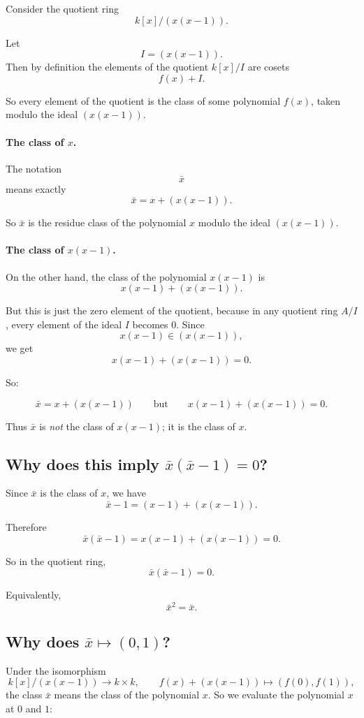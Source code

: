 \documentclass[12pt,a4paper]{article}
\theoremstyle{notespace}
\begin{document}
Consider the quotient ring
\[
k[x]/(x(x-1)).
\]

Let
\[
I=(x(x-1)).
\]
Then by definition the elements of the quotient \(k[x]/I\) are cosets
\[
f(x)+I.
\]

So every element of the quotient is the class of some polynomial \(f(x)\), taken modulo the ideal \((x(x-1))\).

\paragraph{The class of \(x\).}
The notation
\[
\bar x
\]
means exactly
\[
\bar x = x+(x(x-1)).
\]

So \(\bar x\) is the residue class of the polynomial \(x\) modulo the ideal \((x(x-1))\).

\paragraph{The class of \(x(x-1)\).}
On the other hand, the class of the polynomial \(x(x-1)\) is
\[
x(x-1)+(x(x-1)).
\]

But this is just the zero element of the quotient, because in any quotient ring \(A/I\), every element of the ideal \(I\) becomes \(0\). Since
\[
x(x-1)\in (x(x-1)),
\]
we get
\[
x(x-1)+(x(x-1))=0.
\]

So:

\[
\bar x = x+(x(x-1))
\qquad\text{but}\qquad
x(x-1)+(x(x-1))=0.
\]

Thus \(\bar x\) is \emph{not} the class of \(x(x-1)\); it is the class of \(x\).

\subsection*{Why does this imply \(\bar x(\bar x-1)=0\)?}

Since \(\bar x\) is the class of \(x\), we have
\[
\bar x-1=(x-1)+(x(x-1)).
\]

Therefore
\[
\bar x(\bar x-1)
=
x(x-1)+(x(x-1))
=
0.
\]

So in the quotient ring,
\[
\bar x(\bar x-1)=0.
\]

Equivalently,
\[
\bar x^2=\bar x.
\]

\subsection*{Why does \(\bar x\mapsto (0,1)\)?}

Under the isomorphism
\[
k[x]/(x(x-1))\longrightarrow k\times k,
\qquad
f(x)+(x(x-1))\longmapsto (f(0),f(1)),
\]
the class \(\bar x\) means the class of the polynomial \(x\). So we evaluate the polynomial \(x\) at \(0\) and \(1\):
\end{document}
